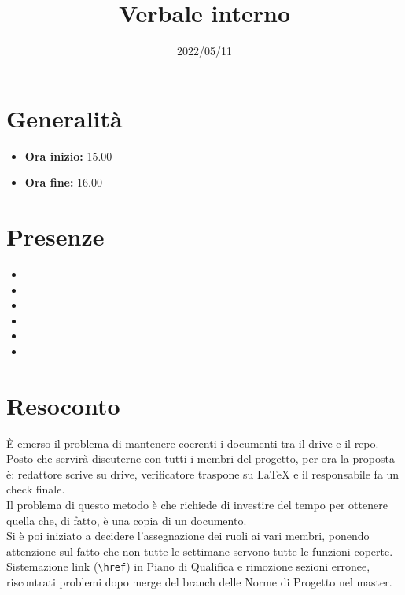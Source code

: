 \documentclass{classes/base}
\title{Verbale interno}
\date{2022/05/11}
\author{\marcob}
\renewcommand{\maketitle}{
    
}
\begin{document}
    \maketitle

    \section*{Generalità}
    \begin{itemize}
        \item \textbf{Ora inizio:} 15.00
        \item \textbf{Ora fine:} 16.00
    \end{itemize}

    \section*{Presenze}
    \begin{itemize}
        \item \tommaso
        \item \marcob
        \item \angela
        \item \giulio
        \item \ruth
        \item \matteo
    \end{itemize}

    \section*{Resoconto}
    È emerso il problema di mantenere coerenti i documenti tra il drive e il repo. Posto che servirà discuterne con tutti i membri del progetto, per ora la proposta è: redattore scrive su drive, verificatore traspone su LaTeX e il responsabile fa un check finale. \\
    Il problema di questo metodo è che richiede di investire del tempo per ottenere quella che, di fatto, è una copia di un documento.\\
    Si è poi iniziato a decidere l'assegnazione dei ruoli ai vari membri, ponendo attenzione sul fatto che non tutte le settimane servono tutte le funzioni coperte.\\
    Sistemazione link (\verb|\href|) in Piano di Qualifica e rimozione sezioni erronee, riscontrati problemi dopo merge del branch delle Norme di Progetto nel master.
\end{document}
